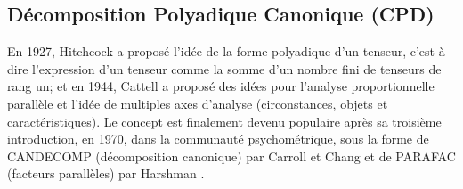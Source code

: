\documentclass[11pt,a4paper,oneside]{book}
\begin{document}
\subsection{Décomposition Polyadique Canonique (CPD)}\label{CPDsec}


En 1927, Hitchcock a proposé l'idée de la forme polyadique d'un tenseur, c'est-à-dire l'expression d'un tenseur comme la somme d'un nombre fini de tenseurs de rang un; et en 1944, Cattell a proposé des idées pour l'analyse proportionnelle parallèle et l'idée de multiples axes d'analyse (circonstances, objets et caractéristiques). Le concept est finalement devenu populaire après sa troisième introduction, en 1970, dans la communauté psychométrique, sous la forme de CANDECOMP (décomposition canonique) par Carroll et Chang et de PARAFAC (facteurs parallèles) par Harshman \cite[p.462]{Hong2008}. 

%
\end{document}
